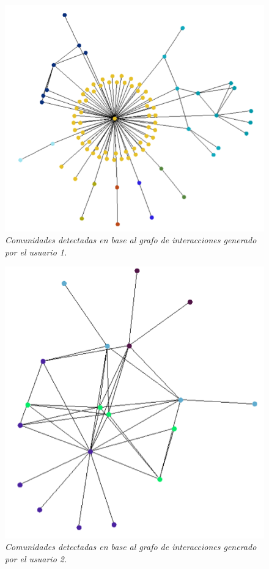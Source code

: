 \begin{figure}
  \centering
  \includegraphics[scale=.7]{images/Figura5-5}
  \caption{\em Comunidades detectadas en base al grafo de interacciones generado por el usuario 1.}
  \label{fig:exp-im5}
\end{figure}

\begin{figure}
  \centering
  \includegraphics[scale=.7]{images/Figura5-6}
  \caption{\em Comunidades detectadas en base al grafo de interacciones generado por el usuario 2.}
  \label{fig:exp-im6}
\end{figure}

